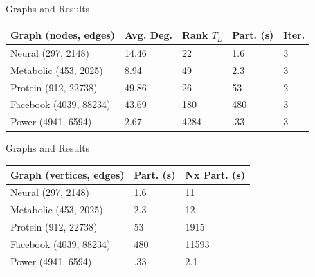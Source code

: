 \documentclass[xcolor=dvipsnames,10pt]{beamer}
\begin{document}
\begin{frame}{Graphs and Results}
\renewcommand{\arraystretch}{1.5}
    \begin{tabular}{| l | l | l | l | l |}
    \hline
    Graph (nodes, edges) & Avg. Deg. & Rank $T_L$ & Part. (s) & Iter. \\ \hline
    Neural (297, 2148) \cite{Watts:1998,White:1986} & 14.46 & 22 & 1.6 & 3 \\ \hline
    Metabolic (453, 2025) \cite{Duch:2005} & 8.94 & 49 & 2.3 & 3 \\  \hline
    Protein (912, 22738) \cite{Simonis:2009} & 49.86 & 26 & 53 & 2 \\ \hline
    Facebook (4039, 88234) \cite{Mcauley:2012} & 43.69 & 180 & 480 & 3 \\ \hline
    Power (4941, 6594) \cite{Watts:1998} & 2.67 & 4284 & .33 & 3\\ 
    \hline
    \end{tabular}
\end{frame}

\begin{frame}{Graphs and Results}
\renewcommand{\arraystretch}{1.5}
    \begin{tabular}{| l | l | l |}
    \hline
    Graph (vertices, edges) & Part. (s) & Nx Part. (s) \\ \hline
    Neural (297, 2148) & 1.6 & 11 \\ \hline
    Metabolic (453, 2025) & 2.3 & 12 \\  \hline
    Protein (912, 22738) & 53 & 1915\\ \hline
    Facebook (4039, 88234) & 480 & 11593 \\ \hline
    Power (4941, 6594) & .33 & 2.1 \\ 
    \hline
    \end{tabular}
\end{frame}
\end{document}
